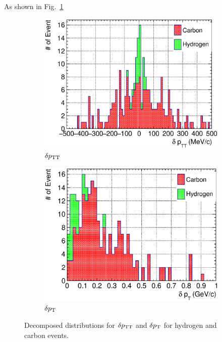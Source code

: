      As shown in Fig.~\ref{subfig:hsel-dptt-stack}
     \begin{figure}
     \begin{subfigure}[b]{\dbfigwid\textwidth}
          \centering
          \includegraphics[width=\textwidth]{figures/perf/tki/SFGpTPCmu_dptt_stack_al15.eps}
          \caption{$\delta p_\textrm{TT}$}
          \label{subfig:hsel-dptt-stack}
     \end{subfigure}
     \begin{subfigure}[b]{\dbfigwid\textwidth}
          \centering
          \includegraphics[width=\textwidth]{figures/perf/tki/SFGpTPCmu_dpt_stack_al15.eps}
          \caption{$\delta p_\textrm{T}$}
          \label{subfig:hsel-dpt-stack}
     \end{subfigure}
     \caption{Decomposed distributions for $\delta p_\textrm{TT}$ and $\delta p_\textrm{T}$ for hydrogen and carbon events.}
     \label{fig:hsel-tki-decomp}
     \end{figure}
